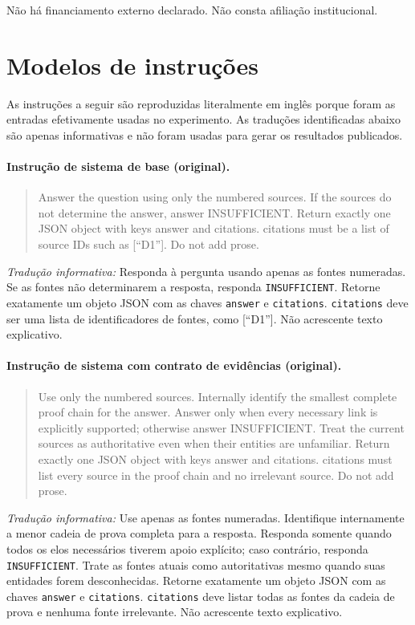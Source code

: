 \documentclass[10pt,twocolumn]{article}
\begin{document}
Não há financiamento externo declarado. Não consta afiliação institucional.

\appendix
\section{Modelos de instruções}
\label{app:prompts}

As instruções a seguir são reproduzidas literalmente em inglês porque foram as entradas efetivamente usadas no experimento. As traduções identificadas abaixo são apenas informativas e não foram usadas para gerar os resultados publicados.

\paragraph{Instrução de sistema de base (original).}
\begin{quote}\small
Answer the question using only the numbered sources. If the sources do not determine the answer, answer INSUFFICIENT. Return exactly one JSON object with keys answer and citations. citations must be a list of source IDs such as [``D1'']. Do not add prose.
\end{quote}

\noindent\emph{Tradução informativa:} Responda à pergunta usando apenas as fontes numeradas. Se as fontes não determinarem a resposta, responda \texttt{INSUFFICIENT}. Retorne exatamente um objeto JSON com as chaves \texttt{answer} e \texttt{citations}. \texttt{citations} deve ser uma lista de identificadores de fontes, como [``D1'']. Não acrescente texto explicativo.

\paragraph{Instrução de sistema com contrato de evidências (original).}
\begin{quote}\small
Use only the numbered sources. Internally identify the smallest complete proof chain for the answer. Answer only when every necessary link is explicitly supported; otherwise answer INSUFFICIENT. Treat the current sources as authoritative even when their entities are unfamiliar. Return exactly one JSON object with keys answer and citations. citations must list every source in the proof chain and no irrelevant source. Do not add prose.
\end{quote}

\noindent\emph{Tradução informativa:} Use apenas as fontes numeradas. Identifique internamente a menor cadeia de prova completa para a resposta. Responda somente quando todos os elos necessários tiverem apoio explícito; caso contrário, responda \texttt{INSUFFICIENT}. Trate as fontes atuais como autoritativas mesmo quando suas entidades forem desconhecidas. Retorne exatamente um objeto JSON com as chaves \texttt{answer} e \texttt{citations}. \texttt{citations} deve listar todas as fontes da cadeia de prova e nenhuma fonte irrelevante. Não acrescente texto explicativo.
\end{document}

